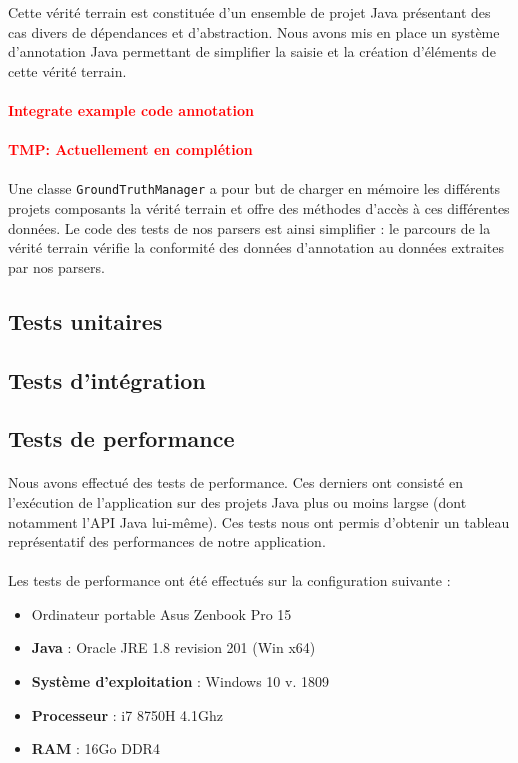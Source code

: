 \documentclass{scrartcl}
\newcommand{\TODO}[1] {
    \noindent \paragraph{\textcolor{red}{#1}}
}
\begin{document}
    Cette vérité terrain est constituée d’un ensemble de projet Java présentant des cas divers de dépendances et d'abstraction. Nous avons mis en place un système d’annotation Java permettant de simplifier la saisie et la création d'éléments de cette vérité terrain.
    
    \TODO{Integrate example code annotation}
    \TODO{TMP: Actuellement en complétion}
    
    \paragraph{}Une classe \texttt{GroundTruthManager} a pour but de charger en mémoire les différents projets composants la vérité terrain et offre des méthodes d'accès à ces différentes données. Le code des tests de nos parsers est ainsi simplifier : le parcours de la vérité terrain vérifie la conformité des données d'annotation au données extraites par nos parsers.

\subsection{Tests unitaires}

\subsection{Tests d'intégration}

\subsection{Tests de performance}

    \paragraph{}Nous avons effectué des tests de performance. Ces derniers ont consisté en l’exécution de l’application sur des projets Java plus ou moins largse (dont notamment l'API Java lui-même). Ces tests nous ont permis d’obtenir un tableau représentatif des performances de notre application.

    \paragraph{}Les tests de performance ont été effectués sur la configuration suivante :
    \begin{itemize}
        \item Ordinateur portable Asus Zenbook Pro 15
        \item \textbf{Java} : Oracle JRE 1.8 revision 201 (Win x64)
        \item \textbf{Système d'exploitation} : Windows 10 v. 1809
        \item \textbf{Processeur} : i7 8750H 4.1Ghz
        \item \textbf{RAM} : 16Go DDR4
    \end{itemize}
    
\end{document}
